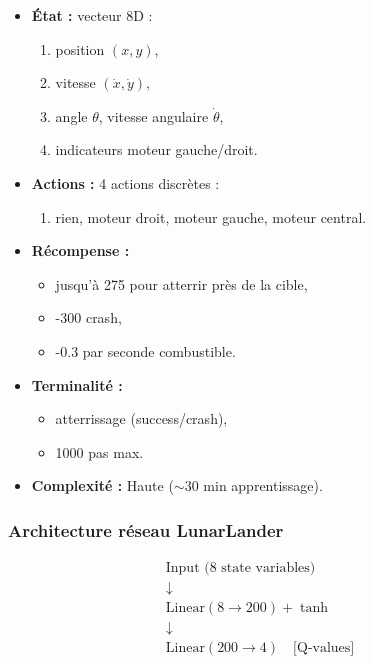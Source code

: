 \documentclass[12pt,a4paper]{article}
\begin{document}
\begin{itemize}
    \item \textbf{État :} vecteur 8D :
    \begin{enumerate}
        \item position $(x, y)$,
        \item vitesse $(\dot{x}, \dot{y})$,
        \item angle $\theta$, vitesse angulaire $\dot{\theta}$,
        \item indicateurs moteur gauche/droit.
    \end{enumerate}

    \item \textbf{Actions :} 4 actions discrètes :
    \begin{enumerate}
        \item rien, moteur droit, moteur gauche, moteur central.
    \end{enumerate}

    \item \textbf{Récompense :}
    \begin{itemize}
        \item jusqu'à 275 pour atterrir près de la cible,
        \item -300 crash,
        \item -0.3 par seconde combustible.
    \end{itemize}

    \item \textbf{Terminalité :}
    \begin{itemize}
        \item atterrissage (success/crash),
        \item 1000 pas max.
    \end{itemize}

    \item \textbf{Complexité :} Haute ($\sim 30$ min apprentissage).
\end{itemize}

\subsubsection{Architecture réseau LunarLander}

\[
\begin{array}{c}
\text{Input (8 state variables)} \\
\downarrow \\
\text{Linear}(8 \to 200) + \tanh \\
\downarrow \\
\text{Linear}(200 \to 4) \quad \text{[Q-values]}
\end{array}
\]
\end{document}
